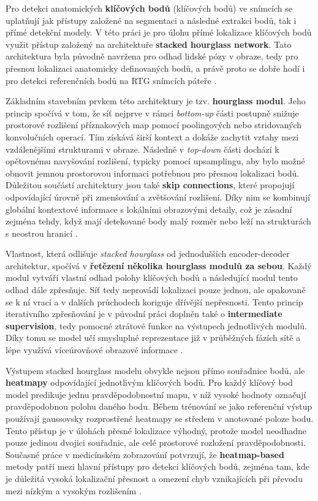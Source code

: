 \documentclass[male,czech,api_bc]{kitheses}
\begin{document}
Pro detekci anatomických \textbf{klíčových bodů} (klíčových bodů) ve snímcích se uplatňují jak přístupy založené na segmentaci a následné extrakci bodů, tak i přímé detekční modely. V této práci je pro úlohu přímé lokalizace klíčových bodů využit přístup založený na architektuře \textbf{stacked hourglass network}. Tato architektura byla původně navržena pro odhad lidské pózy v obraze, tedy pro přesnou lokalizaci anatomicky definovaných bodů, a právě proto se dobře hodí i pro detekci referenčních bodů na RTG snímcích páteře \cite{Newell2016}.

Základním stavebním prvkem této architektury je tzv. \textbf{hourglass modul}. Jeho princip spočívá v tom, že síť nejprve v rámci \textit{bottom-up} části postupně snižuje prostorové rozlišení příznakových map pomocí poolingových nebo stridovaných konvolučních operací. Tím získává širší kontext a dokáže zachytit vztahy mezi vzdálenějšími strukturami v obraze. Následně v \textit{top-down} části dochází k opětovnému navyšování rozlišení, typicky pomocí upsamplingu, aby bylo možné obnovit jemnou prostorovou informaci potřebnou pro přesnou lokalizaci bodů. Důležitou součástí architektury jsou také \textbf{skip connections}, které propojují odpovídající úrovně při zmenšování a zvětšování rozlišení. Díky nim se kombinují globální kontextové informace s lokálními obrazovými detaily, což je zásadní zejména tehdy, když mají detekované body malý rozměr nebo leží na strukturách s neostrou hranicí \cite{Newell2016}.

Vlastnost, která odlišuje \textit{stacked hourglass} od jednodušších encoder-decoder architektur, spočívá v \textbf{řetězení několika hourglass modulů za sebou}. Každý modul vytváří vlastní odhad polohy klíčových bodů a následující modul tento odhad dále zpřesňuje. Síť tedy neprovádí lokalizaci pouze jednou, ale opakovaně se k ní vrací a v dalších průchodech koriguje dřívější nepřesnosti. Tento princip iterativního zpřesňování je v původní práci doplněn také o \textbf{intermediate supervision}, tedy pomocné ztrátové funkce na výstupech jednotlivých modulů. Díky tomu se model učí smysluplné reprezentace již v průběžných fázích sítě a lépe využívá víceúrovňové obrazové informace \cite{Newell2016}.

Výstupem stacked hourglass modelu obvykle nejsou přímo souřadnice bodů, ale \textbf{heatmapy} odpovídající jednotlivým klíčových bodů. Pro každý klíčový bod model predikuje jednu pravděpodobnostní mapu, v níž vysoké hodnoty označují pravděpodobnou polohu daného bodu. Během trénování se jako referenční výstup používají gaussovsky rozprostřené heatmapy se středem v anotované poloze bodu. Tento přístup je v úlohách přesné lokalizace výhodný, protože model neodhadne pouze jedinou dvojici souřadnic, ale celé prostorové rozložení pravděpodobnosti. Současné práce v medicínském zobrazování potvrzují, že \textbf{heatmap-based} metody patří mezi hlavní přístupy pro detekci klíčových bodů, zejména tam, kde je důležitá vysoká lokalizační přesnost a omezení chyb vznikajících při převodu mezi nízkým a vysokým rozlišením \cite{Zhang2024SRLD}.
\end{document}
